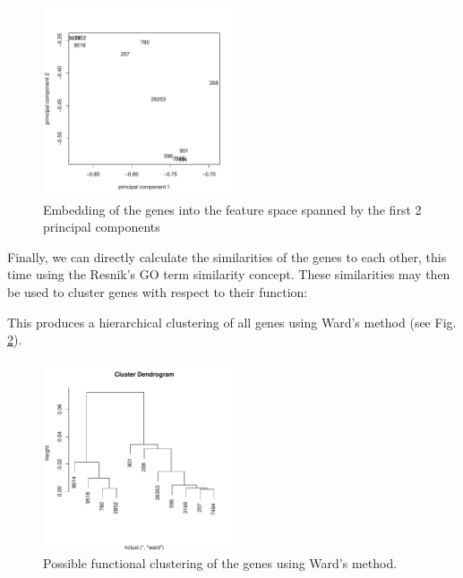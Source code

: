 \documentclass[12pt,a4paper]{article}
\begin{document}
\begin{figure}
\begin{center}
\includegraphics[width=0.5\textwidth]{GOPCAExample.pdf}
\caption{\label{Fig:PCAPlot}Embedding of the genes into the feature space spanned by the first 2 principal components}
\end{center}
\end{figure}

Finally, we can directly calculate the similarities of the genes to each other, this time using the Resnik's GO term similarity concept. These similarities may then be used to cluster genes with respect to their function:
\begin{Schunk}
\end{Schunk}

This produces a hierarchical clustering of all genes using Ward's method (see Fig. \ref{Fig:GOCluster}).

\begin{figure}
\begin{center}
\includegraphics[width=0.5\textwidth]{GOClusterExample.pdf}
\caption{\label{Fig:GOCluster}Possible functional clustering of the genes using Ward's method.}
\end{center}
\end{figure}
\end{document}
